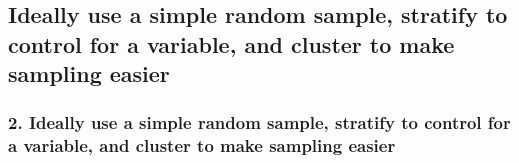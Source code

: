 \documentclass[slidestop,compress,mathserif,12pt,t,professionalfonts,xcolor=table]{beamer}
\begin{document}

\subsection{Ideally use a simple random sample, stratify to control for a variable, and cluster to make sampling easier} 
\label{mi2}


\begin{frame}
\frametitle{2. Ideally use a simple random sample, stratify to control for a variable, 
and cluster to make sampling easier}

\pause

\end{frame}
\end{document}
